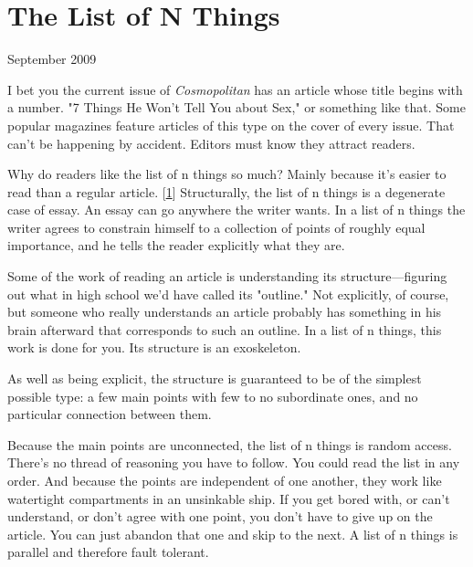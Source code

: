 \chapter{The List of N Things}


            
              
                

September 2009

I bet you the current issue of
                  \emph{Cosmopolitan} has an article whose title begins with a
                  number. "7 Things He Won't Tell You about Sex," or something
                  like that. Some popular magazines feature articles of this
                  type on the cover of every issue. That can't be happening by
                  accident. Editors must know they attract readers.

Why
                  do readers like the list of n things so much? Mainly because
                  it's easier to read than a regular article.
                  [\href{\#f1n}{1}]
                  Structurally, the list of n things is a degenerate case of
                  essay. An essay can go anywhere the writer wants. In a list of
                  n things the writer agrees to constrain himself to a
                  collection of points of roughly equal importance, and he tells
                  the reader explicitly what they are.

Some of the
                  work of reading an article is understanding its
                  structure---figuring out what in high school we'd have
                  called its "outline." Not explicitly, of course, but someone
                  who really understands an article probably has something in
                  his brain afterward that corresponds to such an outline. In a
                  list of n things, this work is done for you. Its structure is
                  an exoskeleton.

As well as being explicit, the
                  structure is guaranteed to be of the simplest possible type: a
                  few main points with few to no subordinate ones, and no
                  particular connection between them.

Because the
                  main points are unconnected, the list of n things is random
                  access. There's no thread of reasoning you have to follow. You
                  could read the list in any order. And because the points are
                  independent of one another, they work like watertight
                  compartments in an unsinkable ship. If you get bored with, or
                  can't understand, or don't agree with one point, you don't
                  have to give up on the article. You can just abandon that one
                  and skip to the next. A list of n things is parallel and
                  therefore fault tolerant.

